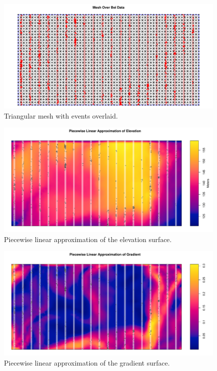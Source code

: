 \documentclass[]{interact}
\begin{document}
\begin{figure}[h]
\includegraphics[width=\textwidth]{figures/bei-effort_mesh.pdf}
\caption{Triangular mesh with events overlaid.}
\label{effortmesh}
\end{figure}

\begin{figure}[h]
\includegraphics[width=\textwidth]{figures/bei-effort_elev_mesh.pdf}
\caption{Piecewise linear approximation of the elevation surface.}
\label{effortelevmesh}
\end{figure}

\begin{figure}[h]
\includegraphics[width=\textwidth]{figures/bei-effort_grad_mesh.pdf}
\caption{Piecewise linear approximation of the gradient surface.}
\label{effortgradmesh}
\end{figure}
\end{document}
